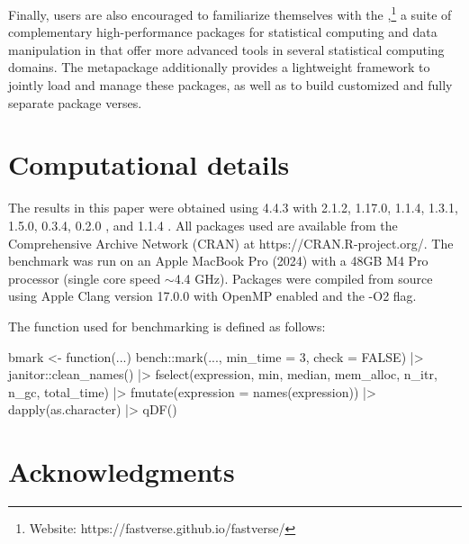 \documentclass[nojss]{jss} %
\newcommand{\fct}[1]{\code{#1()}}
\begin{document}
Finally,  users are also encouraged to familiarize themselves with the \href{https://fastverse.github.io/fastverse/}{},\footnote{Website: https://fastverse.github.io/fastverse/} a suite of complementary high-performance packages for statistical computing and data manipulation in  that offer more advanced tools in several statistical computing domains. The  metapackage additionally provides a lightweight framework to jointly load and manage these packages, as well as to build customized and fully separate package verses.

\newpage

\section*{Computational details}
The results in this paper were obtained using  \citep{R} 4.4.3 with  2.1.2,  1.17.0,  1.1.4,  1.3.1,  1.5.0,  0.3.4,  0.2.0 \citep{rnycflights23}, and  1.1.4 \citep{rbench}. All packages used are available from the Comprehensive  Archive Network (CRAN) at https://CRAN.R-project.org/. The benchmark was run on an Apple MacBook Pro (2024) with a 48GB M4 Pro processor (single core speed $\sim$4.4 GHz). Packages were compiled from source using Apple Clang version 17.0.0 with OpenMP enabled and the -O2 flag. \newline

The \fct{bmark} function used for benchmarking is defined as follows:
\begin{Code}
bmark <- function(...) {
  bench::mark(..., min_time = 3, check = FALSE) |>
    janitor::clean_names() |>
    fselect(expression, min, median, mem_alloc, n_itr, n_gc, total_time) |>
    fmutate(expression = names(expression)) |>
    dapply(as.character) |> qDF()
}
\end{Code}



\section*{Acknowledgments}
\end{document}
